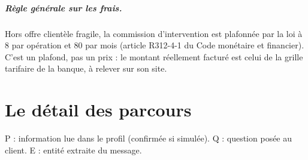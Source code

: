 \paragraph{Règle générale sur les frais.} Hors offre clientèle fragile, la commission
d'intervention est plafonnée par la loi à 8\eur{} par opération et 80\eur{} par mois (article
R312-4-1 du Code monétaire et financier). C'est un plafond, pas un prix : le montant réellement
facturé est celui de la grille tarifaire de la banque, à relever sur son site.

\chapter{Le détail des parcours}
\label{an:parcours}

P : information lue dans le profil (confirmée si simulée). Q : question posée au client.
E : entité extraite du message.

